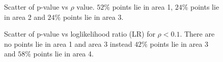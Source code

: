 \documentclass[10pt,conference,letterpaper]{IEEEtran}
\begin{document}



\begin{figure}
\centering
{}
\caption{Scatter of p-value vs $\rho$ value. $52\%$ points lie in area 1, $24\%$ points lie in area 2 and $24\%$ points lie in area 3.} 
\label{fig:scatter-pvalue-vs-rho}
\vspace{-5mm}
\end{figure}

\begin{figure}
\centering
{}
\caption{Scatter of p-value vs loglikelihood ratio (LR) for $\rho < 0.1$. There are no points lie in area 1 and area 3 instead $42\%$ points lie in area 3 and $58\%$ points lie in area 4.} 
\label{fig:scatter-pvalue-vs-lr-for-rho-le-01}
\vspace{-5mm}
\end{figure}

\end{document}
